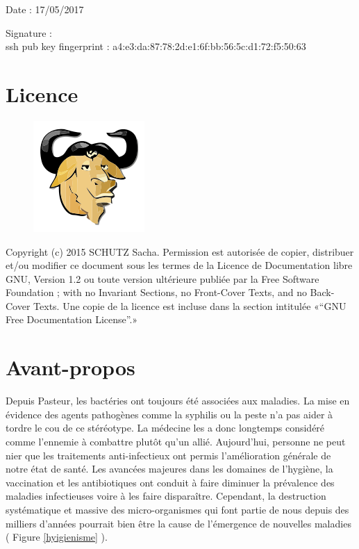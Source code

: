 \documentclass[12pt,a4paper]{article}
\begin{document}
Date : 17/05/2017

\vspace{0.5cm}

Signature : \\

ssh pub key fingerprint : a4:e3:da:87:78:2d:e1:6f:bb:56:5c:d1:72:f5:50:63
\vfill 

\section*{Licence}

\begin{figure}
\includegraphics[scale=0.5]{img/gfdl.png}\hfill
\end{figure}

Copyright (c) 2015 SCHUTZ Sacha. Permission est autorisée de copier,
distribuer et/ou modifier ce document sous les termes de la Licence de
Documentation libre GNU, Version 1.2 ou toute version ultérieure publiée
par la Free Software Foundation ; with no Invariant Sections, no
Front-Cover Texts, and no Back-Cover Texts. Une copie de la licence est
incluse dans la section intitulée «``GNU Free Documentation License''.»

\thispagestyle{empty} 
\setcounter{page}{0}
\thispagestyle{empty} 

\newpage

\tableofcontents
\newpage


\section{Avant-propos}

Depuis Pasteur, les bactéries ont toujours été associées aux maladies. La mise en évidence des agents pathogènes comme la syphilis ou la peste n'a pas aider à tordre le cou de ce stéréotype. La médecine les a donc longtemps considéré comme l'ennemie à combattre plutôt qu'un allié. 
Aujourd'hui, personne ne peut nier que les traitements anti-infectieux ont permis l'amélioration générale de notre état de santé. 
Les avancées majeures dans les domaines de l'hygiène, la vaccination et les antibiotiques ont conduit à faire diminuer la prévalence des maladies infectieuses voire à les faire disparaître. Cependant, la destruction systématique et massive des micro-organismes qui font partie de nous depuis des milliers d'années pourrait bien être la cause de l'émergence de nouvelles maladies ( Figure \ref{hyigienisme} ).
\end{document}
